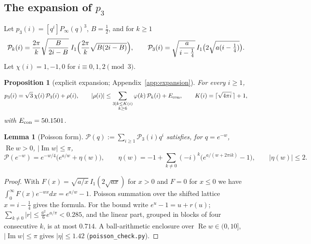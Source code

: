 \documentclass[11pt,reqno]{amsart}
\theoremstyle{plain}
\newtheorem{proposition}[theorem]{Proposition}
\newtheorem{lemma}[theorem]{Lemma}
\theoremstyle{definition}
\newcommand{\cP}{\mathcal{P}}
\renewcommand{\Re}{\operatorname{Re}}
\renewcommand{\Im}{\operatorname{Im}}
\begin{document}
\subsection{The expansion of $p_3$}
Let $p_3(i)=[q^i]P_\infty(q)^3$, $B=\frac12$, and for $k\ge1$
\[
\cP_k(i)=\frac{2\pi}{k}\sqrt{\frac{B}{2i-B}}\;I_1\Bigl(\frac{2\pi}{k}\sqrt{B(2i-B)}\Bigr),\qquad \cP_3(i)=\sqrt{\frac{a}{i-\frac14}}\,I_1\bigl(2\sqrt{a(i-\tfrac14)}\bigr).
\]
Let $\chi(i)=1,-1,0$ for $i\equiv0,1,2\pmod3$.

\begin{proposition}[explicit expansion; Appendix~\ref{app:expansion}]\label{prop:expansion}
For every $i\ge1$,
\[
p_3(i)=\sqrt3\,\chi(i)\,\cP_3(i)+\rho(i),\qquad
|\rho(i)|\le\sum_{\substack{3\mid k\le K(i)\\ k\ge6}}\varphi(k)\,\cP_k(i)+E_{\rm con},\qquad K(i)=\lceil\sqrt{4\pi i}\,\rceil+1,
\]
with $E_{\rm con}=50.1501$.
\end{proposition}

\begin{lemma}[Poisson form]\label{lem:poisson}
$\cP(q):=\sum_{i\ge1}\cP_3(i)q^i$ satisfies, for $q=e^{-w}$, $\Re w>0$, $|\Im w|\le\pi$,
\[
\cP(e^{-w})=e^{-w/4}\bigl(e^{a/w}+\eta(w)\bigr),\qquad \eta(w)=-1+\sum_{k\ne0}(-i)^k\bigl(e^{a/(w+2\pi ik)}-1\bigr),\qquad|\eta(w)|\le 2.
\]
\end{lemma}
\begin{proof}
With $F(x)=\sqrt{a/x}\,I_1(2\sqrt{ax})$ for $x>0$ and $F=0$ for $x\le0$ we have $\int_0^\infty F(x)e^{-wx}dx=e^{a/w}-1$. Poisson
summation over the shifted lattice $x=i-\frac14$ gives the formula. For the bound write $e^u-1=u+r(u)$; $\sum_{k\ne0}|r|\le
\frac{a^2}6e^{a/\pi}<0.285$, and the linear part, grouped in blocks of four consecutive $k$, is at most $0.714$. A ball-arithmetic
enclosure over $\Re w\in(0,10]$, $|\Im w|\le\pi$ gives $|\eta|\le1.42$ (\texttt{poisson\_check.py}).
\end{proof}
\end{document}

